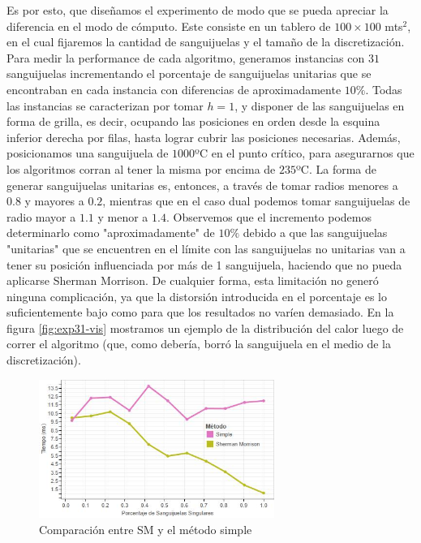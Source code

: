 Es por esto, que diseñamos el experimento de modo que se pueda apreciar la diferencia en el modo de cómputo. Este consiste en un tablero de $100 \times 100$ mts$^2$, en el cual fijaremos la cantidad de sanguijuelas y el tamaño de la discretización. Para medir la performance de cada algoritmo, generamos instancias con $31$ sanguijuelas incrementando el porcentaje de sanguijuelas unitarias que se encontraban en cada instancia con diferencias de aproximadamente $10\%$. Todas las instancias se caracterizan por tomar $h = 1$, y disponer de las sanguijuelas en forma de grilla, es decir, ocupando las posiciones en orden desde la esquina inferior derecha por filas, hasta lograr cubrir las posiciones necesarias. Además, posicionamos una sanguijuela de $1000$ºC en el punto crítico, para asegurarnos que los algoritmos corran al tener la misma por encima de $235$ºC. La forma de generar sanguijuelas unitarias es, entonces, a través de tomar radios menores a $0.8$ y mayores a $0.2$, mientras que en el caso dual podemos tomar sanguijuelas de radio mayor a $1.1$ y menor a $1.4$. Observemos que el incremento podemos determinarlo como "aproximadamente" de $10\%$ debido a que las sanguijuelas "unitarias" que se encuentren en el límite con las sanguijuelas no unitarias van a tener su posición influenciada por más de 1 sanguijuela, haciendo que no pueda aplicarse Sherman Morrison. De cualquier forma, esta limitación no generó ninguna complicación, ya que la distorsión introducida en el porcentaje es lo suficientemente bajo como para que los resultados no varíen demasiado. En la figura \ref{fig:exp31-vis} mostramos un ejemplo de la distribución del calor luego de correr el algoritmo (que, como debería, borró la sanguijuela en el medio de la discretización).

\begin{figure}[h]
    \centering
    \includegraphics[width=0.685\textwidth]{experimento 3-1}
    \caption{Comparación entre SM y el método simple}
    \label{fig:exp31}
\end{figure}

